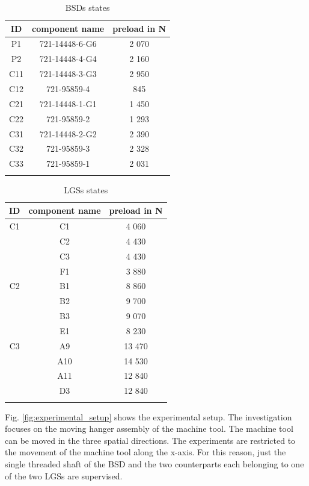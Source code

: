 \begin{center}
\begin{longtable}{||c c c||} 
 \hline
 ID & component name & preload in N \\ [0.5ex] 
 \hline
 P1 & 721-14448-6-G6 & 2 070 \\ 
 P2 & 721-14448-4-G4 & 2 160 \\ 
 C11 & 721-14448-3-G3 & 2 950 \\ 
 C12 & 721-95859-4 & 845 \\ 
 C21  & 721-14448-1-G1 & 1 450 \\ [1ex] 
 C22  & 721-95859-2 & 1 293 \\ [1ex] 
 C31  & 721-14448-2-G2 & 2 390 \\ [1ex] 
 C32  & 721-95859-3 & 2 328 \\ [1ex] 
 C33 & 721-95859-1 & 2 031 \\ [1ex]
   \hline
\caption {BSDs states}
\label {tab:BSDs_states}
\end{longtable}
\end{center}


\begin{center}
\begin{longtable}{||c c c||} 
 \hline
 ID & component name & preload in N \\ [0.5ex] 
 \hline\hline
 C1 & C1 & 4 060 \\ 
    & C2 & 4 430 \\ 
    & C3 & 4 430 \\
    & F1 & 3 880 \\ 
 \hline
 C2 & B1 & 8 860 \\ 
    & B2 & 9 700 \\ [1ex] 
    & B3 & 9 070 \\ [1ex]
    & E1 & 8 230 \\ [1ex]
 \hline
 C3 & A9 & 13 470 \\ 
    & A10 & 14 530 \\ [1ex] 
    & A11 & 12 840 \\ [1ex]
    & D3 & 12 840 \\ [1ex]
 \hline
\caption {LGSs states}
\label {tab:LGSs_states}
\end{longtable}
\end{center}

Fig. \ref{fig:experimental_setup} shows the experimental setup. The investigation focuses on the moving hanger assembly of the machine tool. The machine tool can be moved in the three spatial directions. The experiments are restricted to the movement of the machine tool along the x-axis. For this reason, just the single threaded shaft of the BSD and the two counterparts each belonging to one of the two LGSs are supervised.

